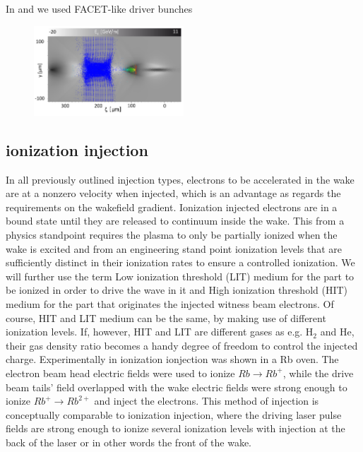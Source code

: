 In \cite{PlaTo} and \cite{PlaTo2} we used FACET-like driver bunches 






\begin{figure}[ht]
\begin{center}
\includegraphics[width=0.5\textwidth]{simulations/images/edited/FF_torch.pdf}
\end{center}
\caption{}
\label{img:Plato_FF}
\end{figure}

\subsection{ionization injection}
In all previously outlined injection types, electrons to be accelerated in the wake are at a nonzero velocity when injected, which is an advantage as regards the requirements on the wakefield gradient. Ionization injected electrons are in a bound state until they are released to continuum inside the wake. This from a physics standpoint requires the plasma to only be partially ionized when the wake is excited and from an engineering stand point ionization levels that are sufficiently distinct in their ionization rates to ensure a controlled ionization. We will further use the term Low ionization threshold (LIT) medium for the part to be ionized in order to drive the wave in it and High ionization threshold (HIT) medium for the part that originates the injected witness beam electrons. Of course, HIT and LIT medium can be the same, by making use of different ionization levels. If, however, HIT and LIT are different gases as e.g. H$_2$ and He, their gas density ratio becomes a handy degree of freedom to control the injected charge.
Experimentally in \cite{Navid_distributed_PRL} ionization ionjection was shown in a Rb oven. The electron beam head electric fields were used to ionize $Rb\rightarrow Rb^+$, while the drive beam tails' field overlapped with the wake electric fields were strong enough to ionize $Rb^+ \rightarrow Rb^{2+}$ and inject the electrons. This method of injection is conceptually comparable to ionization injection, where the driving laser pulse fields are strong enough to ionize several ionization levels with injection at the back of the laser or in other words the front of the wake\cite{Pak_Ion_InjectionPRL2010}.

